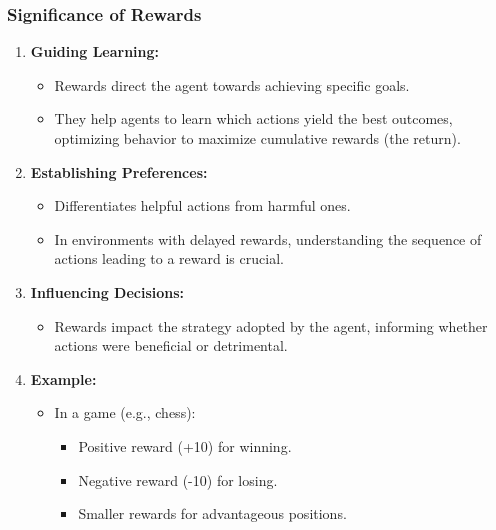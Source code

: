 \documentclass{beamer}
\begin{document}
\begin{frame}[fragile]
    \frametitle{Significance of Rewards}
    \begin{enumerate}
        \item \textbf{Guiding Learning:}
        \begin{itemize}
            \item Rewards direct the agent towards achieving specific goals.
            \item They help agents to learn which actions yield the best outcomes, optimizing behavior to maximize cumulative rewards (the return).
        \end{itemize}

        \item \textbf{Establishing Preferences:}
        \begin{itemize}
            \item Differentiates helpful actions from harmful ones.
            \item In environments with delayed rewards, understanding the sequence of actions leading to a reward is crucial.
        \end{itemize}

        \item \textbf{Influencing Decisions:}
        \begin{itemize}
            \item Rewards impact the strategy adopted by the agent, informing whether actions were beneficial or detrimental.
        \end{itemize}

        \item \textbf{Example:}
        \begin{itemize}
            \item In a game (e.g., chess):
            \begin{itemize}
                \item Positive reward (+10) for winning.
                \item Negative reward (-10) for losing.
                \item Smaller rewards for advantageous positions.
            \end{itemize}
        \end{itemize}
    \end{enumerate}
\end{frame}
\end{document}
